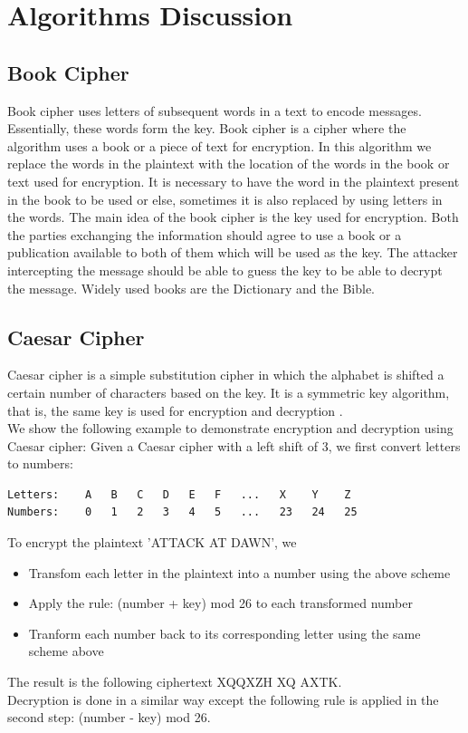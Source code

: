 \documentclass[12pt]{article}
\begin{document}
\section{Algorithms Discussion}
\subsection{Book Cipher}
Book cipher uses letters of subsequent words in a text to encode messages. Essentially, these words form the key. Book cipher is a cipher where the algorithm uses a book or a piece of text for encryption. In this algorithm we replace the words in the plaintext with the location of the words in the book or text used for encryption. It is necessary to have the word in the plaintext present in the book to be used or else, sometimes it is also replaced by using letters in the words. The main idea of the book cipher is the key used for encryption. Both the parties exchanging the information should agree to use a book or a publication available to both of them which will be used as the key. The attacker intercepting the message should be able to guess the key to be able to decrypt the message. Widely used books are the Dictionary and the Bible.

\subsection{Caesar Cipher}
Caesar cipher is a simple substitution cipher in which the alphabet is shifted a certain number of characters based on the key. It is a symmetric key algorithm, that is, the same key is used for encryption and decryption \cite{busta2002encryption}. \\
We show the following example to demonstrate encryption and decryption using Caesar cipher: 
Given a Caesar cipher with a left shift of 3, we first convert letters to numbers:
\begin{lstlisting}
Letters: 	A   B   C   D   E   F   ...   X    Y    Z
Numbers: 	0   1   2   3   4   5   ...   23   24   25
\end{lstlisting}
To encrypt the plaintext 'ATTACK AT DAWN', we
\begin{itemize}
\item Transfom each letter in the plaintext into a number using the above scheme
\item Apply the rule: (number + key) mod 26 to each transformed number
\item Tranform each number back to its corresponding letter using the same scheme above
\end{itemize}
The result is the following ciphertext XQQXZH XQ AXTK. \\ 
Decryption is done in a similar way except the following rule is applied in the second step: (number - key) mod 26.
\end{document}
